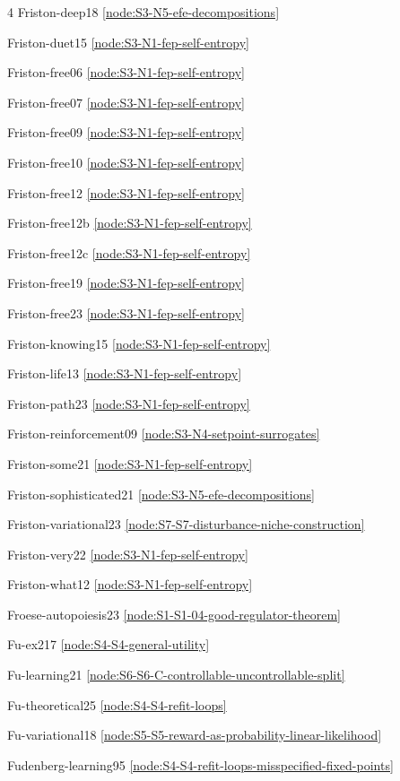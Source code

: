 \documentclass[10pt]{article}
\begin{document}
{\begin{multicols}{4}
Friston-deep18 \hfill \ref{node:S3-N5-efe-decompositions}\par
Friston-duet15 \hfill \ref{node:S3-N1-fep-self-entropy}\par
Friston-free06 \hfill \ref{node:S3-N1-fep-self-entropy}\par
Friston-free07 \hfill \ref{node:S3-N1-fep-self-entropy}\par
Friston-free09 \hfill \ref{node:S3-N1-fep-self-entropy}\par
Friston-free10 \hfill \ref{node:S3-N1-fep-self-entropy}\par
Friston-free12 \hfill \ref{node:S3-N1-fep-self-entropy}\par
Friston-free12b \hfill \ref{node:S3-N1-fep-self-entropy}\par
Friston-free12c \hfill \ref{node:S3-N1-fep-self-entropy}\par
Friston-free19 \hfill \ref{node:S3-N1-fep-self-entropy}\par
Friston-free23 \hfill \ref{node:S3-N1-fep-self-entropy}\par
Friston-knowing15 \hfill \ref{node:S3-N1-fep-self-entropy}\par
Friston-life13 \hfill \ref{node:S3-N1-fep-self-entropy}\par
Friston-path23 \hfill \ref{node:S3-N1-fep-self-entropy}\par
Friston-reinforcement09 \hfill \ref{node:S3-N4-setpoint-surrogates}\par
Friston-some21 \hfill \ref{node:S3-N1-fep-self-entropy}\par
Friston-sophisticated21 \hfill \ref{node:S3-N5-efe-decompositions}\par
Friston-variational23 \hfill \ref{node:S7-S7-disturbance-niche-construction}\par
Friston-very22 \hfill \ref{node:S3-N1-fep-self-entropy}\par
Friston-what12 \hfill \ref{node:S3-N1-fep-self-entropy}\par
Froese-autopoiesis23 \hfill \ref{node:S1-S1-04-good-regulator-theorem}\par
Fu-ex217 \hfill \ref{node:S4-S4-general-utility}\par
Fu-learning21 \hfill \ref{node:S6-S6-C-controllable-uncontrollable-split}\par
Fu-theoretical25 \hfill \ref{node:S4-S4-refit-loops}\par
Fu-variational18 \hfill \ref{node:S5-S5-reward-as-probability-linear-likelihood}\par
Fudenberg-learning95 \hfill \ref{node:S4-S4-refit-loops-misspecified-fixed-points}\par

\end{multicols}}
\end{document}
